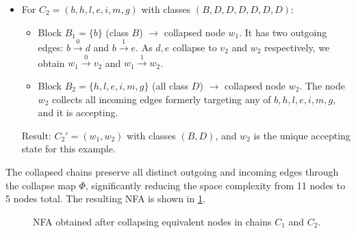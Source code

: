 \begin{example}
\begin{itemize}
        \item For $C_2 = (b,h,l,e,i,m,g)$ with classes $(B,D,D,D,D,D,D)$:
        \begin{itemize}
            \item Block $B_1 = \{b\}$ (class $B$) $\rightarrow$ collapsed node $w_1$. It has two outgoing edges: $b \xrightarrow{0} d$ and $b \xrightarrow{1} e$. As $d,e$ collapse to $v_2$ and $w_2$ respectively, we obtain $w_1 \xrightarrow{0} v_2$ and $w_1 \xrightarrow{1} w_2$.
            \item Block $B_2 = \{h,l,e,i,m,g\}$ (all class $D$) $\rightarrow$ collapsed node $w_2$. The node $w_2$ collects all incoming edges formerly targeting any of $b,h,l,e,i,m,g$, and it is accepting.
        \end{itemize}
        Result: $C_2' = (w_1, w_2)$ with classes $(B,D)$, and $w_2$ is the unique accepting state for this example.
    \end{itemize}
    
    The collapsed chains preserve all distinct outgoing and incoming edges through the collapse map $\Phi$, significantly reducing the space complexity from 11 nodes to 5 nodes total. The resulting NFA is shown in \cref{fig:minimized_chains}.

    \begin{figure}[H]
        \centering
        \caption{NFA obtained after collapsing equivalent nodes in chains $C_1$ and $C_2$.}
        \label{fig:minimized_chains}
    \end{figure} 
\end{example}

